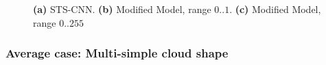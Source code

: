 \begin{figure}[]
	\centering
	\centering
	\caption{
		\textbf{(a)} STS-CNN.
		\textbf{(b)} Modified Model, range $0..1$.
		\textbf{(c)} Modified Model, range $0..255$}
	\label{fig:improvedModel_experiment_1}
\end{figure}


\subsubsection{Average case: Multi-simple cloud shape}

